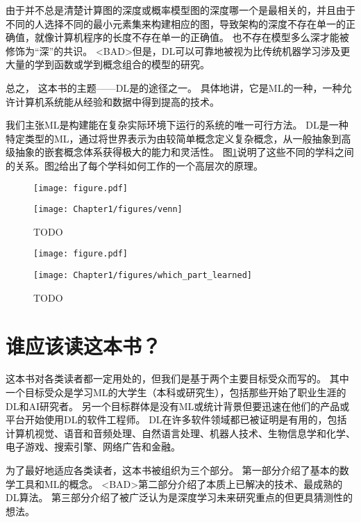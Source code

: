 
由于并不总是清楚计算图的深度或概率模型图的深度哪一个是最相关的，并且由于不同的人选择不同的最小元素集来构建相应的图，导致架构的深度不存在单一的正确值，就像计算机程序的长度不存在单一的正确值。
也不存在模型多么深才能被修饰为``深''的共识。
<BAD>但是，\gls{DL}可以可靠地被视为比传统机器学习涉及更大量的学到函数或学到概念组合的模型的研究。

总之， 这本书的主题——\gls{DL}是的途径之一。
具体地讲，它是\gls{ML}的一种，一种允许计算机系统能从经验和数据中得到提高的技术。

我们主张\gls{ML}是构建能在复杂实际环境下运行的系统的唯一可行方法。
\gls{DL}是一种特定类型的\gls{ML}，通过将世界表示为由较简单概念定义复杂概念，从一般抽象到高级抽象的嵌套概念体系获得极大的能力和灵活性。
图\ref{fig:chap1_venn}说明了这些不同的学科之间的关系。图\ref{fig:chap1_which_part_learned}给出了每个学科如何工作的一个高层次的原理。
\begin{figure}[!hbt]
\ifOpenSource
\centerline{\texttt{[image: figure.pdf]}}
\else
\centerline{\texttt{[image: Chapter1/figures/venn]}}
\fi
\caption{TODO}
\label{fig:chap1_venn}
\end{figure}
\begin{figure}[!htb]
\ifOpenSource
\centerline{\texttt{[image: figure.pdf]}}
\else
\centerline{\texttt{[image: Chapter1/figures/which\_part\_learned]}}
\fi
\caption{TODO}
\label{fig:chap1_which_part_learned}
\end{figure}

\section{谁应该读这本书？}
\label{sec:who_should_read_this_book}

这本书对各类读者都一定用处的，但我们是基于两个主要目标受众而写的。
其中一个目标受众是学习\gls{ML}的大学生（本科或研究生），包括那些开始了职业生涯的\gls{DL}和\gls{AI}研究者。
另一个目标群体是没有\gls{ML}或统计背景但要迅速在他们的产品或平台开始使用\gls{DL}的软件工程师。
\gls{DL}在许多软件领域都已被证明是有用的，包括计算机视觉、语音和音频处理、自然语言处理、机器人技术、生物信息学和化学、电子游戏、搜索引擎、网络广告和金融。


为了最好地适应各类读者，这本书被组织为三个部分。
第一部分介绍了基本的数学工具和\gls{ML}的概念。
<BAD>第二部分介绍了本质上已解决的技术、最成熟的\gls{DL}算法。
第三部分介绍了被广泛认为是深度学习未来研究重点的但更具猜测性的想法。

